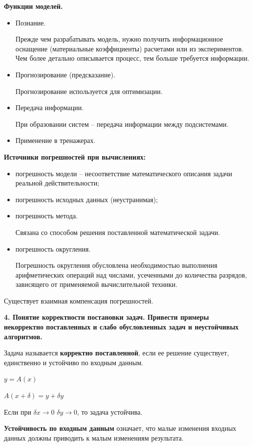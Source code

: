 \documentclass[a4paper,14pt]{article}
\begin{document}
\textbf{Функции моделей.}

\begin{itemize}
	\item Познание.
	
	Прежде чем разрабатывать модель, нужно получить
	информационное оснащение (материальные коэффициенты) расчетами или из экспериментов.
	Чем более детально описывается процесс, тем больше требуется информации.
	\item Прогнозирование (предсказание).
	
	Прогнозирование используется для оптимизации.
	\item Передача информации.
	
	При образовании систем -- передача информации между подсистемами.
	\item Применение в тренажерах.
\end{itemize}

\textbf{Источники погрешностей при вычислениях:}

\begin{itemize}
	\item погрешность модели -- несоответствие математического описания задачи
	реальной действительности;
	\item погрешность исходных данных (неустранимая);
	\item погрешность метода.
	
	Связана со способом решения поставленной математической задачи.
	\item погрешность округления.
	
	Погрешность округления обусловлена необходимостью выполнения
	арифметических операций над числами, усеченными до количества
	разрядов, зависящего от применяемой вычислительной техники.
\end{itemize}

Существует взаимная компенсация погрешностей.

\textbf{4. Понятие корректности постановки задач. Привести примеры некорректно поставленных и слабо обусловленных задач и  неустойчивых алгоритмов.}

Задача называется \textbf{корректно поставленной}, если
ее решение существует, единственно и устойчиво по входным данным.

$y = A(x)$

$A(x + \delta) = y + \delta y$

Если при $\delta x \rightarrow 0 $ $\delta y \rightarrow 0 $, то задача устойчива.

\textbf{Устойчивость по входным данным} означает, что малые изменения входных данных
должны приводить к малым изменениям результата.
\end{document}
